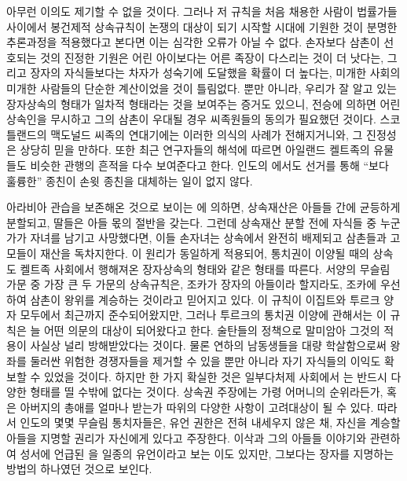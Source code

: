아무런 이의도 제기할 수 없을 것이다.
그러나
저 규칙을 처음 채용한 사람이
법률가들 사이에서
봉건제적 상속규칙이
논쟁의 대상이 되기 시작할 시대에
기원한 것이
분명한 추론과정을
적용했다고 본다면 이는
심각한 오류가 아닐 수 없다.
손자보다 삼촌이 선호되는 것의 진정한 기원은
어린 아이보다는 어른 족장이 다스리는 것이 더 낫다는,
그리고 장자의 자식들보다는
차자가 성숙기에 도달했을 확률이 더 높다는,
미개한 사회의 미개한 사람들의 단순한 계산이었을 것이 틀림없다.
뿐만 아니라,
우리가 잘 알고 있는 장자상속의 형태가 일차적 형태라는 것을 보여주는
증거도 있으니,
전승에 의하면
어린 상속인을 무시하고 그의 삼촌이 우대될 경우
씨족원들의 동의가 필요했던 것이다.
스코틀랜드의 맥도널드 씨족의 연대기에는
이러한 의식의 사례가 전해지거니와,
그 진정성은 상당히 믿을 만하다.
또한 최근 연구자들의 해석에 따르면
아일랜드 켈트족의 유물들도 비슷한 관행의 흔적을 다수 보여준다고 한다.
인도의 에서도
선거를 통해
``보다 훌륭한'' 종친이
손윗 종친을
대체하는 일이 없지 않다.

아라비아 관습을 보존해온 것으로 보이는
에 의하면,
상속재산은 아들들 간에 균등하게 분할되고,
딸들은 아들 몫의 절반을 갖는다.
그런데 상속재산 분할 전에 자식들 중 누군가가 자녀를 남기고 사망했다면,
이들 손자녀는 상속에서 완전히 배제되고 삼촌들과 고모들이 재산을 독차지한다.
이 원리가 동일하게 적용되어,
통치권이 이양될 때의 상속도
켈트족 사회에서 행해져온 장자상속의 형태와
같은 형태를 따른다.
서양의 무슬림 가문 중 가장 큰 두 가문의 상속규칙은,
조카가 장자의 아들이라 할지라도, 조카에 우선하여 삼촌이 왕위를
계승하는 것이라고 믿어지고 있다.
이 규칙이 이집트와 투르크 양자 모두에서
최근까지 준수되어왔지만,
그러나
투르크의 통치권 이양에 관해서는 이 규칙은
늘 어떤 의문의 대상이 되어왔다고 한다.
술탄들의 정책으로 말미암아 그것의 적용이 사실상 널리 방해받았다는 것이다.
물론 연하의 남동생들을 대량 학살함으로써
왕좌를 둘러싼 위험한 경쟁자들을 제거할 수 있을 뿐만 아니라
자기 자식들의 이익도 확보할 수 있었을 것이다.
하지만 한 가지 확실한 것은
일부다처제 사회에서
는 반드시 다양한 형태를 띨 수밖에 없다는 것이다.
상속권 주장에는
가령 어머니의 순위라든가, 혹은 아버지의 총애를 얼마나 받는가 따위의
다양한 사항이 고려대상이 될 수 있다.
따라서 인도의 몇몇 무슬림 통치자들은,
유언 권한은 전혀 내세우지 않은 채,
자신을 계승할 아들을 지명할 권리가 자신에게 있다고 주장한다.
이삭과 그의 아들들 이야기와 관련하여 성서에 언급된
을 일종의 유언이라고 보는 이도 있지만,
그보다는 장자를 지명하는 방법의 하나였던 것으로 보인다.

